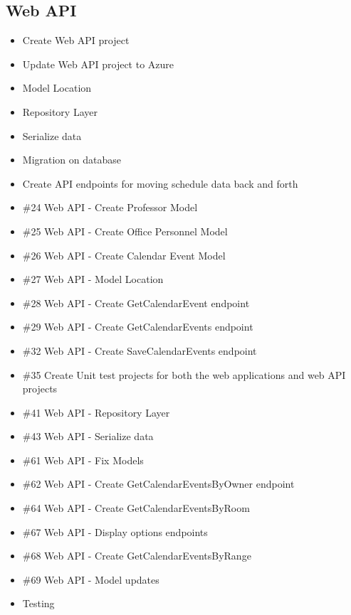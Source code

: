 \subsection*{Web API}
\begin{itemize}
\item Create Web API project
\item Update Web API project to Azure
\item Model Location
\item Repository Layer
\item Serialize data
\item Migration on database
\item Create API endpoints for moving schedule data back and forth
\item \#24 Web API - Create Professor Model
\item \#25 Web API - Create Office Personnel Model
\item \#26 Web API - Create Calendar Event Model
\item \#27 Web API - Model Location
\item \#28 Web API - Create GetCalendarEvent endpoint
\item \#29 Web API - Create GetCalendarEvents endpoint
\item \#32 Web API - Create SaveCalendarEvents endpoint
\item \#35 Create Unit test projects for both the web applications and web API projects
\item \#41 Web API - Repository Layer
\item \#43 Web API - Serialize data
\item \#61 Web API - Fix Models
\item \#62 Web API - Create GetCalendarEventsByOwner endpoint
\item \#64 Web API - Create GetCalendarEventsByRoom
\item \#67 Web API - Display options endpoints
\item \#68 Web API - Create GetCalendarEventsByRange
\item \#69 Web API - Model updates
\item Testing
\end{itemize}

